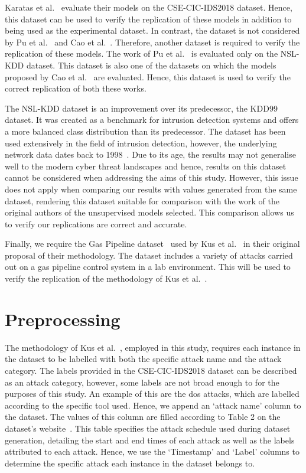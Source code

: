 Karatas et al.~\cite{Karatas} evaluate their models on the CSE-CIC-IDS2018
dataset. Hence, this dataset can be used to verify the replication of these
models in addition to being used as the experimental dataset. In contrast, the
dataset is not considered by Pu et al.~\cite{Pu} and Cao et al.~\cite{Cao}.
Therefore, another dataset is required to verify the replication of these
models. The work of Pu et al.~\cite{Pu} is evaluated only on the NSL-KDD
dataset. This dataset is also one of the datasets on which the models proposed
by Cao et al.~\cite{Cao} are evaluated. Hence, this dataset is used to verify
the correct replication of both these works.

The NSL-KDD dataset is an improvement over its predecessor, the KDD99 dataset.
It was created as a benchmark for intrusion detection systems and offers a more
balanced class distribution than its predecessor. The dataset has been used
extensively in the field of intrusion detection, however, the underlying
network data dates back to 1998~\cite{nsl}. Due to its age, the results may not
generalise well to the modern cyber threat landscapes and hence, results on
this dataset cannot be considered when addressing the aims of this study.
However, this issue does not apply when comparing our results with values
generated from the same dataset, rendering this dataset suitable for comparison
with the work of the original authors of the unsupervised models selected. This
comparison allows us to verify our replications are correct and accurate.

Finally, we require the Gas Pipeline dataset~\cite{gas_pipeline_dataset} used
by Kus et al.~\cite{Kus} in their original proposal of their methodology. The
dataset includes a variety of attacks carried out on a gas pipeline control
system in a lab environment. This will be used to verify the replication of the
methodology of Kus et al.~\cite{Kus}.

\section{Preprocessing}%
\label{sec:preprocessing}

The methodology of Kus et al.~\cite{Kus}, employed in this study, requires each
instance in the dataset to be labelled with both the specific attack name and
the attack category. The labels provided in the CSE-CIC-IDS2018 dataset can be
described as an attack category, however, some labels are not broad enough to
for the purposes of this study. An example of this are the \gls{dos} attacks,
which are labelled according to the specific tool used. Hence, we append an
`attack name' column to the dataset. The values of this column are filled
according to Table 2 on the dataset's website~\cite{cic2018}. This table
specifies the attack schedule used during dataset generation, detailing the
start and end times of each attack as well as the labels attributed to each
attack. Hence, we use the `Timestamp' and `Label' columns to determine the
specific attack each instance in the dataset belongs to.

